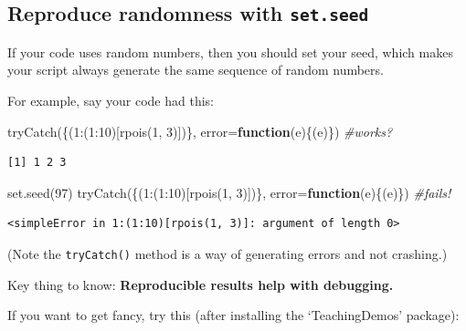 \documentclass[
  letterpaper,
  DIV=11,
  numbers=noendperiod]{scrreprt}
\newenvironment{Shaded}{\begin{snugshade}}{\end{snugshade}}
\newcommand{\AttributeTok}[1]{\textcolor[rgb]{0.49,0.56,0.16}{#1}}
\newcommand{\CommentTok}[1]{\textcolor[rgb]{0.38,0.63,0.69}{\textit{#1}}}
\newcommand{\ControlFlowTok}[1]{\textcolor[rgb]{0.00,0.44,0.13}{\textbf{#1}}}
\newcommand{\DecValTok}[1]{\textcolor[rgb]{0.25,0.63,0.44}{#1}}
\newcommand{\FunctionTok}[1]{\textcolor[rgb]{0.02,0.16,0.49}{#1}}
\newcommand{\NormalTok}[1]{\textcolor[rgb]{0.00,0.44,0.13}{#1}}
\newcommand{\SpecialCharTok}[1]{\textcolor[rgb]{0.25,0.44,0.63}{#1}}
\begin{document}
\hypertarget{reproduce-randomness-with-set.seed}{%
\subsection{\texorpdfstring{Reproduce randomness with
\texttt{set.seed}}{Reproduce randomness with set.seed}}\label{reproduce-randomness-with-set.seed}}

If your code uses random numbers, then you should set your seed, which
makes your script always generate the same sequence of random numbers.

For example, say your code had this:

\begin{Shaded}
\begin{Highlighting}[]
\FunctionTok{tryCatch}\NormalTok{(\{(}\DecValTok{1}\SpecialCharTok{:}\NormalTok{(}\DecValTok{1}\SpecialCharTok{:}\DecValTok{10}\NormalTok{)[}\FunctionTok{rpois}\NormalTok{(}\DecValTok{1}\NormalTok{, }\DecValTok{3}\NormalTok{)])\}, }\AttributeTok{error=}\ControlFlowTok{function}\NormalTok{(e)\{(e)\}) }\CommentTok{\#works?}
\end{Highlighting}
\end{Shaded}

\begin{verbatim}
[1] 1 2 3
\end{verbatim}

\begin{Shaded}
\begin{Highlighting}[]
\FunctionTok{set.seed}\NormalTok{(}\DecValTok{97}\NormalTok{)}
\FunctionTok{tryCatch}\NormalTok{(\{(}\DecValTok{1}\SpecialCharTok{:}\NormalTok{(}\DecValTok{1}\SpecialCharTok{:}\DecValTok{10}\NormalTok{)[}\FunctionTok{rpois}\NormalTok{(}\DecValTok{1}\NormalTok{, }\DecValTok{3}\NormalTok{)])\}, }\AttributeTok{error=}\ControlFlowTok{function}\NormalTok{(e)\{(e)\}) }\CommentTok{\#fails!}
\end{Highlighting}
\end{Shaded}

\begin{verbatim}
<simpleError in 1:(1:10)[rpois(1, 3)]: argument of length 0>
\end{verbatim}

(Note the \texttt{tryCatch()} method is a way of generating errors and
not crashing.)

Key thing to know: \textbf{Reproducible results help with debugging.}

If you want to get fancy, try this (after installing the `TeachingDemos'
package):
\end{document}
